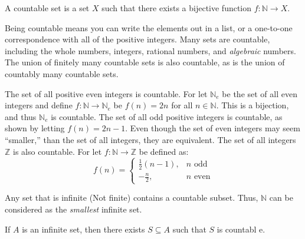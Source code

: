             \begin{definition}
                A countable set is a set $X$ such that there exists a
                bijective function $f:\mathbb{N}\rightarrow{X}$.
            \end{definition}
            Being countable means you can write
            the elements out in a list, or a
            one-to-one correspondence with all of
            the positive integers. Many sets are countable,
            including the whole numbers, integers, rational
            numbers, and \textit{algebraic} numbers. The
            union of finitely many countable sets is also
            countable, as is the union of countably many
            countable sets.
            \begin{example}
                The set of all positive even integers is
                countable. For let $\mathbb{N}_{e}$ be the
                set of all even integers and define
                $f:\mathbb{N}\rightarrow\mathbb{N}_{e}$ be
                $f(n)=2n$ for all $n\in\mathbb{N}$. This is
                a bijection, and thus $\mathbb{N}_{e}$ is
                countable. The set of all odd positive integers
                is countable, as shown by letting
                $f(n)=2n-1$. Even though the set of even
                integers may seem ``smaller,'' than the set of
                all integers, they are equivalent. The set of
                all integers $\mathbb{Z}$ is also countable.
                For let $f:\mathbb{N}\rightarrow\mathbb{Z}$
                be defined as:
                \begin{equation}
                    f(n)=
                    \begin{cases}
                        \frac{1}{2}(n-1),&n\textrm{ odd}\\
                        -\frac{n}{2},&n\textrm{ even}
                    \end{cases}
                \end{equation}
            \end{example}
            Any set that is infinite (Not finite) contains a
            countable subset. Thus, $\mathbb{N}$ can be
            considered as the \textit{smallest} infinite set.
            \begin{theorem}
                If $A$ is an infinite set, then there exists
                $S\subseteq{A}$ such that $S$ is countabl e.
            \end{theorem}
